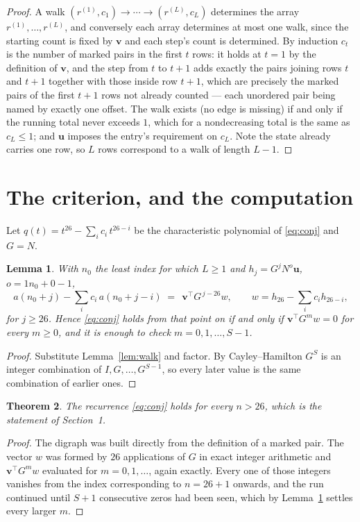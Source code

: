 \documentclass[11pt,a4paper]{article}
\theoremstyle{plain}
\newtheorem{theorem}{Theorem}
\newtheorem{lemma}[theorem]{Lemma}
\theoremstyle{definition}
\begin{document}
\begin{proof}
A walk $(r^{(1)},c_1)\to\cdots\to(r^{(L)},c_L)$ determines the array
$r^{(1)},\dots,r^{(L)}$, and conversely each array determines at most one walk, since the
starting count is fixed by $\mathbf{v}$ and each step's count is determined. By induction
$c_t$ is the number of marked pairs in the first $t$ rows: it holds at $t=1$ by the
definition of $\mathbf{v}$, and the step from $t$ to $t+1$ adds exactly the pairs joining
rows $t$ and $t+1$ together with those inside row $t+1$, which are precisely the marked
pairs of the first $t+1$ rows not already counted --- each unordered pair being named by
exactly one offset. The walk exists (no edge is missing) if and only if the running total
never exceeds $1$, which for a nondecreasing total is the same as $c_L\le1$; and
$\mathbf{u}$ imposes the entry's requirement on $c_L$. Note the state already carries one
row, so $L$ rows correspond to a walk of length $L-1$.
\end{proof}

\section{The criterion, and the computation}

Let $q(t)=t^{26}-\sum_i c_i\,t^{26-i}$ be the characteristic polynomial of
\eqref{eq:conj} and $G=N$.

\begin{lemma}\label{lem:crit}
With $n_0$ the least index for which $L\ge1$ and $h_j=G^{j}N^{o}\mathbf{u}$,
$o=1n_0+0-1$,
\[
a(n_0+j)-\sum_i c_i\,a(n_0+j-i)\;=\;\,\mathbf{v}^{\!\top}G^{\,j-26}w,
\qquad w=h_{26}-\sum_i c_i h_{26-i},
\]
for $j\ge26$. Hence \eqref{eq:conj} holds from that point on if and only if
$\mathbf{v}^{\!\top}G^{m}w=0$ for every $m\ge0$, and it is enough to check
$m=0,1,\dots,S-1$.
\end{lemma}

\begin{proof}
Substitute Lemma~\ref{lem:walk} and factor. By Cayley--Hamilton $G^{S}$ is an integer
combination of $I,G,\dots,G^{S-1}$, so every later value is the same combination of earlier
ones.
\end{proof}

\begin{theorem}
The recurrence \eqref{eq:conj} holds for every $n>26$, which is the statement of
Section~1.
\end{theorem}

\begin{proof}
The digraph was built directly from the definition of a marked pair. The vector $w$ was
formed by $26$ applications of $G$ in exact integer arithmetic and
$\mathbf{v}^{\!\top}G^{m}w$ evaluated for $m=0,1,\dots$, again exactly. Every one of
those integers vanishes from the index corresponding to $n=26+1$ onwards, and the run
continued until $S+1$ consecutive zeros had been seen, which by Lemma~\ref{lem:crit}
settles every larger $m$.
\end{proof}
\end{document}
